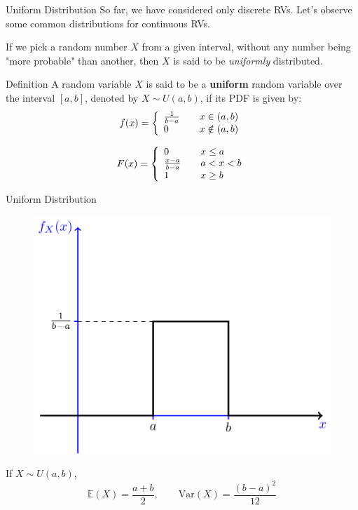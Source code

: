 \documentclass{beamer}
\newcommand{\E}{\mathbb{E}}
\newcommand{\Var}{\text{Var}}
\begin{document}
	
	\begin{frame}{Uniform Distribution}
		So far, we have considered only discrete RVs. Let's observe some common distributions for continuous RVs.
		
		\pause
		If we pick a random number $X$ from a given interval, without any number being "more probable" than another, then $X$ is said to be \textit{uniformly} distributed.\pause
		\begin{block}{Definition}
			A random variable $X$ is said to be a \textbf{uniform} random variable over the interval $[a,b]$, denoted by $X\sim U(a,b)$, if its PDF is given by:
			\begin{equation}
				\nonumber f(x) = \left\{
				\begin{array}{l l}
					\frac{1}{b-a} & \quad x\in (a,b)\\
					0 & \quad x\notin (a,b)
				\end{array} \right.
			\end{equation}
		\end{block}\pause
		
		\begin{equation}
			\nonumber F(x) = \left\{
			\begin{array}{l l l}
				0 & \quad x \le a\\
				\frac{x-a}{b-a} & \quad a < x < b\\
				1 & \quad x \ge b
			\end{array} \right.
		\end{equation}
		
	\end{frame}
	\begin{frame}{Uniform Distribution}
		\begin{figure}
			\centering
			\label{fig:0}
			\includegraphics[width=0.6\linewidth]{ex_pdf}
		\end{figure}
		\pause
		If $X\sim U(a,b)$,
		\[ \E(X) = \frac{a+b}{2},\qquad \Var(X)=\frac{(b-a)^2}{12} \]
		
	\end{frame}
	
\end{document}
